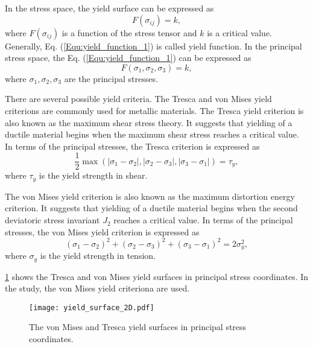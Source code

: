 In the stress space, the yield surface can be expressed as
\begin{equation}
F\left( {{\sigma _{ij}}} \right) = k,
\label{Equ:yield_function_1}
\end{equation}
where $F\left( {{\sigma _{ij}}} \right)$ is a function of the stress tensor and $k$ is a critical value. Generally, Eq. (\ref{Equ:yield_function_1}) is called yield function. In the principal stress space, the Eq. (\ref{Equ:yield_function_1}) can be expressed as
\begin{equation}
F\left( {{\sigma _1},{\sigma _2},{\sigma _3}} \right) = k,
\end{equation}
where ${\sigma _1},{\sigma _2},{\sigma _3}$ are the principal stresses.

There are several possible yield criteria. The Tresca and von Mises yield criterions are commonly used for metallic materials. The Tresca yield criterion is also known as the maximum shear stress theory. It suggests that yielding of a ductile material begins when the maximum shear stress reaches a critical value. In terms of the principal stresses, the Tresca criterion is expressed as
\begin{equation}
\frac{1}{2}\max \left( {\left| {{\sigma _1} - {\sigma _2}} \right|,\left| {{\sigma _2} - {\sigma _3}} \right|,\left| {{\sigma _3} - {\sigma _1}} \right|} \right) = \tau_y,
\end{equation}
where $\tau_y$ is the yield strength in shear.

The von Mises yield criterion is also known as the maximum distortion energy criterion. It suggests that yielding of a ductile material begins when the second deviatoric stress invariant $J_2$ reaches a critical value. In terms of the principal stresses, the von Mises yield criterion is expressed as
\begin{equation}
{\left( {{\sigma _1} - {\sigma _2}} \right)^2} + {\left( {{\sigma _2} - {\sigma _3}} \right)^2} + {\left( {{\sigma _3} - {\sigma _1}} \right)^2} = 2\sigma _y^2,
\end{equation}
where $\sigma_y$ is the yield strength in tension.

\ref{Fig:YieldSurface3D} shows the Tresca and von Mises yield surfaces in principal stress coordinates. 
In the study, the von Mises yield criteriona are used.

\begin{figure}[!htp]
\centering
\texttt{[image: yield\_surface\_2D.pdf]}
\caption{The von Mises and Tresca yield surfaces in principal stress coordinates.}
\label{Fig:YieldSurface3D}
\end{figure}

